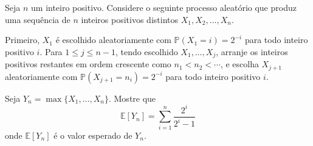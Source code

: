 Seja \(n\) um inteiro positivo. Considere o seguinte processo aleatório que produz uma sequência de \(n\) inteiros positivos distintos \(X_1, X_2, \ldots, X_n\).

Primeiro, \(X_1\) é escolhido aleatoriamente com \(\mathbb{P}(X_1 = i) = 2^{-i}\) para todo inteiro positivo \(i\). Para \(1 \le j \le n-1\), tendo escolhido \(X_1, \ldots, X_j\), arranje os inteiros positivos restantes em ordem crescente como \(n_1 < n_2 < \cdots\), e escolha \(X_{j+1}\) aleatoriamente com \(\mathbb{P}(X_{j+1} = n_i) = 2^{-i}\) para todo inteiro positivo \(i\).

Seja \(Y_n = \max\{X_1, \ldots, X_n\}\). Mostre que
\[
\mathbb{E}[Y_n] = \sum_{i=1}^{n} \frac{2^i}{2^i - 1}
\]
onde \(\mathbb{E}[Y_n]\) é o valor esperado de \(Y_n\).
